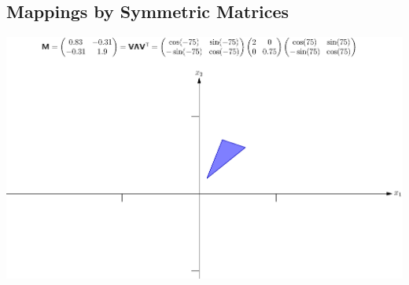 \documentclass[25pt,landscape,footrule]{foils}
\begin{document}
\begin{slide}
\section[-2]{Mappings by Symmetric Matrices}

\pb \pause
\begin{center}
  \includegraphics[width=\linewidth]{symmatrixPicture1}
\end{center}
\end{slide}


\end{document}
